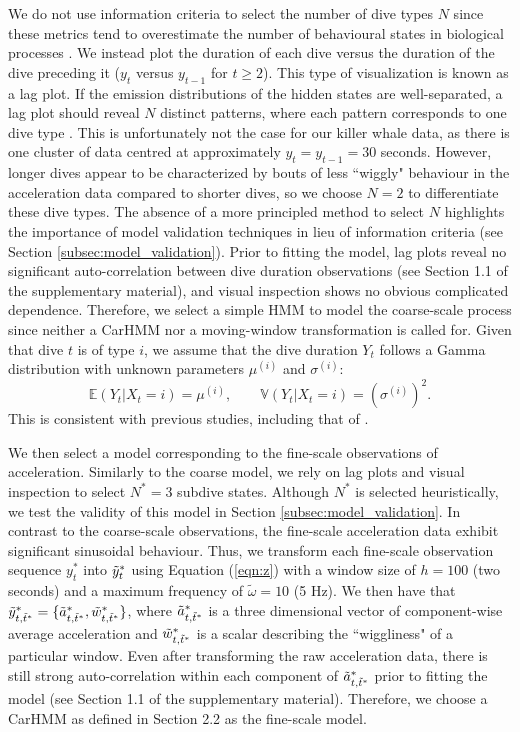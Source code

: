 We do not use information criteria to select the number of dive types $N$ since these metrics tend to overestimate the number of behavioural states in biological processes \citep{Pohle:2017}. We instead plot the duration of each dive versus the duration of the dive preceding it ($y_t$ versus $y_{t-1}$ for $t \geq 2$). This type of visualization is known as a lag plot. If the emission distributions of the hidden states are well-separated, a lag plot should reveal $N$ distinct patterns, where each pattern corresponds to one dive type \citep{Lawler:2019}. This is unfortunately not the case for our killer whale data, as there is one cluster of data centred at approximately $y_t = y_{t-1} = 30$ seconds. However, longer dives appear to be characterized by bouts of less ``wiggly" behaviour in the acceleration data compared to shorter dives, so we choose $N = 2$ to differentiate these dive types. The absence of a more principled method to select $N$ highlights the importance of model validation techniques in lieu of information criteria (see Section \ref{subsec:model_validation}).
%
Prior to fitting the model, lag plots reveal no significant auto-correlation between dive duration observations (see Section 1.1 of the supplementary material), and visual inspection shows no obvious complicated dependence. Therefore, we select a simple HMM to model the coarse-scale process since neither a CarHMM nor a moving-window transformation is called for.
%
Given that dive $t$ is of type $i$, we assume that the dive duration $Y_t$ follows a Gamma distribution with unknown parameters $\mu^{(i)}$ and $\sigma^{(i)}$:
%
$$\mathbb{E}(Y_t|X_t = i) = \mu^{(i)}, \qquad \mathbb{V}(Y_t|X_t = i) = \left(\sigma^{(i)}\right)^2.$$
%
This is consistent with previous studies, including that of \citet{Barajas:2017}. 
%

We then select a model corresponding to the fine-scale observations of acceleration. Similarly to the coarse model, we rely on lag plots and visual inspection to select $N^*=3$ subdive states. Although $N^*$ is selected heuristically, we test the validity of this model in Section \ref{subsec:model_validation}.
%
In contrast to the coarse-scale observations, the fine-scale acceleration data exhibit significant sinusoidal behaviour. Thus, we transform each fine-scale observation sequence $y_t^*$ into $\tilde{y}^*_t$ using Equation (\ref{eqn:z}) with a window size of $h=100$ (two seconds) and a maximum frequency of $\tilde{\omega}=10$ (5 Hz). 
We then have that $\tilde{y}^*_{t,\tilde t^*} = \{\tilde{a}^*_{t,\tilde t^*},\tilde{w}^*_{t,\tilde t^*}\}$, where $\tilde{a}^*_{t,\tilde t^*}$ is a three dimensional vector of component-wise average acceleration and $\tilde{w}^*_{t,\tilde t^*}$ is a scalar describing the ``wiggliness" of a particular window. Even after transforming the raw acceleration data, there is still strong auto-correlation within each component of $\tilde{a}^*_{t,\tilde t^*}$ prior to fitting the model (see Section 1.1 of the supplementary material). Therefore, we choose a CarHMM as defined in Section 2.2 as the fine-scale model.


